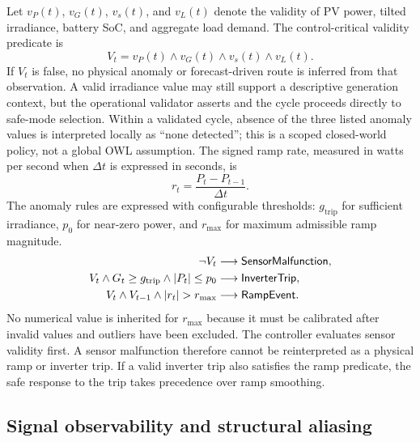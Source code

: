 Let $v_P(t)$, $v_G(t)$, $v_s(t)$, and $v_L(t)$ denote the validity of PV power, tilted irradiance, battery SoC, and aggregate load demand. The control-critical validity predicate is
\begin{equation}
\label{eq:validity}
V_t=v_P(t)\wedge v_G(t)\wedge v_s(t)\wedge v_L(t).
\end{equation}
If $V_t$ is false, no physical anomaly or forecast-driven route is inferred from that observation. A valid irradiance value may still support a descriptive generation context, but the operational validator asserts  and the cycle proceeds directly to safe-mode selection. Within a validated cycle, absence of the three listed anomaly values is interpreted locally as ``none detected''; this is a scoped closed-world policy, not a global OWL assumption.
The signed ramp rate, measured in watts per second when $\Delta t$ is expressed in seconds, is
\begin{equation}
\label{eq:signed-ramp}
r_t=\frac{P_t-P_{t-1}}{\Delta t}.
\end{equation}
The anomaly rules are expressed with configurable thresholds: $g_{\mathrm{trip}}$ for sufficient irradiance, $p_0$ for near-zero power, and $r_{\max}$ for maximum admissible ramp magnitude.
\begin{align}
\neg V_t
&\longrightarrow \valueof{SensorMalfunction},
\label{eq:sensor-malfunction}\\
V_t\wedge G_t\geq g_{\mathrm{trip}}
\wedge |P_t|\leq p_0
&\longrightarrow \valueof{InverterTrip},
\label{eq:inverter-trip}\\
V_t\wedge V_{t-1}\wedge |r_t|>r_{\max}
&\longrightarrow \valueof{RampEvent}.
\label{eq:ramp-event}
\end{align}
No numerical value is inherited for $r_{\max}$ because it must be calibrated after invalid values and outliers have been excluded. The controller evaluates sensor validity first. A sensor malfunction therefore cannot be reinterpreted as a physical ramp or inverter trip. If a valid inverter trip also satisfies the ramp predicate, the safe response to the trip takes precedence over ramp smoothing.

\subsection{Signal observability and structural aliasing}


